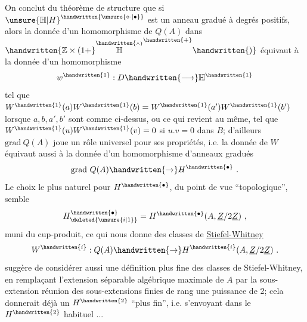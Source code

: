 On conclut du  théorème de structure que si ${\unsure{\mathbb{H}|H}}^{\handwritten{\unsure{\circ\cdot|\bullet}}}$ est un anneau gradué à degrés positifs, alors la donnée d'un homomorphisme  de $Q(A)$ dans $\handwritten{\mathbb{Z}\times(1+}\overset{\handwritten{\scriptscriptstyle\wedge}}{\mathbb{H}}^{\handwritten{+}}\handwritten{)}$ équivaut à la donnée d'un homomorphisme
\[
w^{\handwritten{1}}:D\handwritten{\longrightarrow}\mathbb{H}^{\handwritten{1}}
\]
tel que $W^{\handwritten{1}}(a)W^{\handwritten{1}}(b)=W^{\handwritten{1}}(a')W^{\handwritten{1}}(b')$ lorsque $a,b,a',b'$ sont comme ci-dessus, ou ce qui revient au même, tel que $W^{\handwritten{1}}(u)W^{\handwritten{1}}(v)=0$ si $u.v=0$ dans $B$;  d'ailleurs $\mathrm{grad}\ Q(A)$ joue un rôle universel pour ses propriétés, i.e. la donnée de $W$ équivaut aussi à la donnée d'un homomorphisme  d'anneaux gradués
\[
\mathrm{grad}\ Q(A)\handwritten{\to}H^{\handwritten{\bullet}}\ .
\]
Le choix le plus naturel pour $H^{\handwritten{\bullet}}$, du point de vue ``topologique'', semble
\[
H_{\deleted{\unsure{i|1}}}^{\handwritten{\bullet}}=H^{\handwritten{\bullet}}(A,\underline{Z}/2\underline{Z})\ ,
\]
muni du cup-produit, ce qui nous donne des classes de \uline{Stiefel-Whitney}
\[
W^{\handwritten{i}}:Q(A)\handwritten{\to}H^{\handwritten{i}}(A,\underline{Z}/2\underline{Z})\ .
\]
 suggère de  considérer aussi une définition plus fine des classes de Stiefel-Whitney, en remplaçant  l'extension séparable algébrique maximale de $A$ par la sous-extension réunion des sous-extensions finies de rang une puissance de 2; cela donnerait déjà un $H^{\handwritten{2}}$ ``plus fin'', i.e. s'envoyant dans le $H^{\handwritten{2}}$ habituel ...

